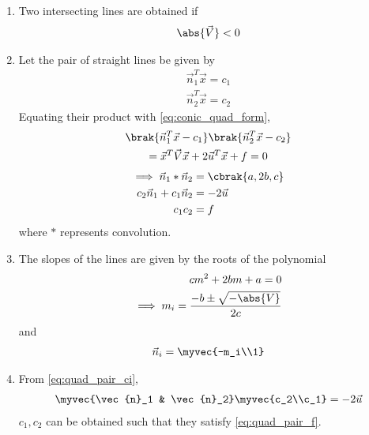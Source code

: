 \renewcommand{\theequation}{\theenumi}
\begin{enumerate}[label=\thesection.\arabic*.,ref=\thesection.\theenumi]

\item Two intersecting lines are obtained if 
\begin{align}
\label{eq:quad_pair_det}
\abs{\vec{V}} < 0
\end{align}

\item Let the pair of straight lines be given by 
\begin{align}
\label{eq:quad_pair_lines}
\vec{n}_1^T \vec{x} = c_1
\\
\vec{n}_2^T \vec{x} = c_2
\end{align}
Equating their product with \eqref{eq:conic_quad_form},
\begin{multline}
\brak{\vec{n}_1^T \vec{x} - c_1}
\brak{\vec{n}_2^T \vec{x} - c_2} 
\\
=
\vec{x}^T\vec{V}\vec{x}+2\vec{u}^T\vec{x}+f=0
\end{multline}
\begin{align}
\implies 
\vec{n}_1 *\vec{n}_2  &= \cbrak{a,2b,c}
\label{eq:quad_pair_conv}
\\
c_2\vec{n}_1 + c_1 \vec{n}_2 &= -2\vec{u}
\label{eq:quad_pair_ci}
\\
c_1 c_2 &= f
\label{eq:quad_pair_f}
\end{align}
%
where $*$ represents convolution.
\item The slopes of the lines are given by the roots of the polynomial
\begin{align}
\label{eq:quad_pair_slopes}
cm^2 + 2bm + a = 0
\\
\implies m_i = \frac{-b \pm \sqrt{-\abs{V}}}{2c}
\end{align}
and 
\begin{align}
\vec{n}_i = \myvec{-m_i\\1}
\end{align}
\item From \eqref{eq:quad_pair_ci},
\begin{align}
\myvec{\vec{n}_1 & \vec{n}_2}\myvec{c_2\\c_1} = -2\vec{u}
\end{align}
$c_1,c_2$ can be obtained such that they satisfy \eqref{eq:quad_pair_f}.



\end{enumerate}
